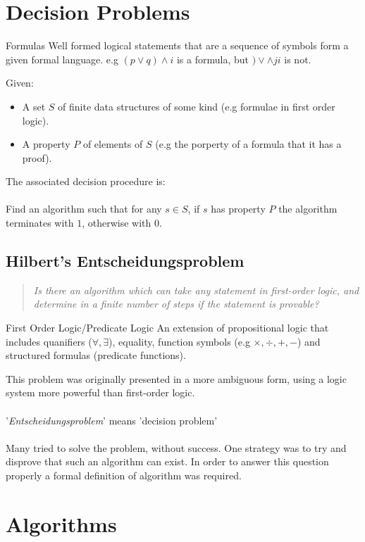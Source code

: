 \section{Decision Problems}
\begin{definitionbox}{Formulas}
    Well formed logical statements that are a sequence of symbols form a given formal language. e.g $(p \lor q) \land i$ is a formula, but $) \lor \land j i$ is not.
\end{definitionbox}
Given:
\begin{itemize}
	\item A set $S$ of finite data structures of some kind (e.g formulae in first order logic).
	\item A property $P$ of elements of $S$ (e.g the porperty of a formula that it has a proof).
\end{itemize}
The associated decision procedure is:
\\
\\ Find an algorithm such that for any $s \in S$, if $s$ has property $P$ the algorithm terminates with $1$, otherwise with $0$.

\subsection{Hilbert's Entscheidungsproblem}
\begin{quote}
    \textit{Is there an algorithm which can take any statement in first-order logic, and determine in a finite number of steps if the statement is provable?}
\end{quote}
\begin{definitionbox}{First Order Logic/Predicate Logic}
    An extension of propositional logic that includes quanifiers ($\forall, \exists$), equality, function symbols (e.g $\times, \div, +, -$) and structured formulas (predicate functions).
\end{definitionbox}

\noindent This problem was originally presented in a more ambiguous form, using a logic system more powerful than first-order logic.
\\
\\ '\textit{Entscheidungsproblem}' means 'decision problem'
\\
\\ Many tried to solve the problem, without success. One strategy was to try and disprove that such an algorithm can exist.
In order to answer this question properly a formal definition of algorithm was required.
\section{Algorithms}
